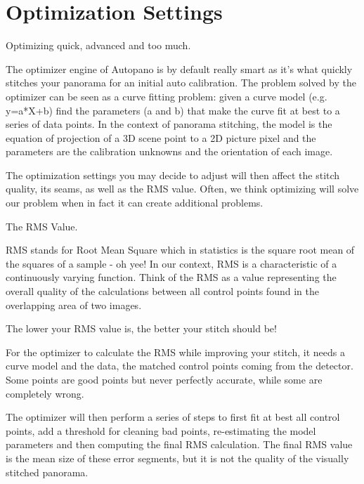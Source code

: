 \chapter{Optimization Settings}
\pagecolor{white}
\label{chap:35}
\begin{fullwidth}

\problem

{\large Optimizing quick, advanced and too much. \par}

The optimizer engine of Autopano is by default really smart as it’s what quickly stitches your panorama for an initial auto calibration. The problem solved by the optimizer can be seen as a curve fitting problem: given a curve model (e.g. y=a*X+b) find the parameters (a and b) that make the curve fit at best to a series of data points. In the context of panorama stitching, the model is the equation of projection of a 3D scene point to a 2D picture pixel and the parameters are the calibration unknowns and the orientation of each image.

The optimization settings you may decide to adjust will then affect the stitch quality, its seams, as well as the RMS value. Often, we think optimizing will solve our problem when in fact it can create additional problems.

\solution

{\large The RMS Value. \par}

RMS stands for Root Mean Square which in statistics is the square root mean of the squares of a sample - oh yee! In our context, RMS is a characteristic of a continuously varying function. Think of the RMS as a value representing the overall quality of the calculations between all control points found in the overlapping area of two images.

The lower your RMS value is, the better your stitch should be!


For the optimizer to calculate the RMS while improving your stitch, it needs a curve model and the data, the matched control points coming from the detector. Some points are good points but never perfectly accurate, while some are completely wrong. 

The optimizer will then perform a series of steps to first fit at best all control points, add a threshold for cleaning bad points, re-estimating the model parameters and then computing the final RMS calculation. The final RMS value is the mean size of these error segments, but it is not the quality of the visually stitched panorama.


\end{fullwidth}
